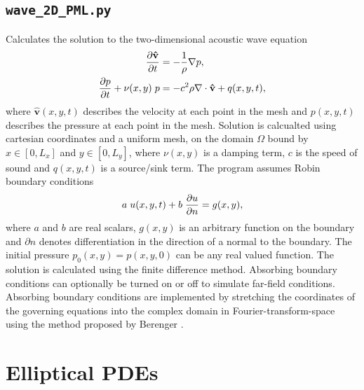 \documentclass{article}
\begin{document}
\subsection{\texttt{wave\_2D\_PML.py}}
Calculates the solution to the two-dimensional acoustic wave equation
\begin{equation*}
\begin{aligned}
\frac{\partial \mathbf{\hat{v}}}{\partial t} &= - \frac{1}{\rho} \nabla p,\\
\frac{\partial p}{\partial t} + \nu(x,y) \hspace{0.1cm} p &= -c^2 \rho \nabla \cdot \mathbf{\hat{v}} + q(x,y,t),
\end{aligned}
\end{equation*}
where $\mathbf{\hat{v}}(x,y,t)$ describes the velocity at each point in the mesh and $p(x,y,t)$ describes the pressure at each point in the mesh. Solution is calcualted using cartesian coordinates and a uniform mesh, on the domain $\Omega$ bound by $x \in [0,L_x]$ and $y \in [0,L_y]$, where $\nu(x,y)$ is a damping term, $c$ is the speed of sound and $q(x,y,t)$ is a source/sink term. The program assumes Robin boundary conditions
\begin{equation*}
a \hspace{0.1cm} u(x,y,t) + b \hspace{0.1cm} \frac{\partial u}{\partial n} = g(x,y),
\end{equation*}
where $a$ and $b$ are real scalars, $g(x,y)$ is an arbitrary function on the boundary and $\partial n$ denotes differentiation in the direction of a normal to the boundary. The initial pressure $p_0(x,y)=p(x,y,0)$ can be any real valued function. The solution is calculated using the finite difference method. Absorbing boundary conditions can optionally be turned on or off to simulate far-field conditions. Absorbing boundary conditions are implemented by stretching the coordinates of the governing equations into the complex domain in Fourier-transform-space using the method proposed by Berenger \cite{Berenger1994}.


\section{Elliptical PDEs}
\end{document}
